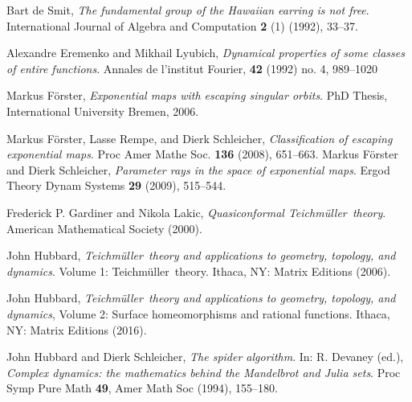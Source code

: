 \documentclass[10pt,reqno,a4paper]{amsart}
\numberwithin{figure}{section}
\numberwithin{equation}{section}
\newcommand{\tei}{Teichm\"uller}
\begin{document}
\begin{thebibliography}{RSSS}
	Bart de Smit,
	\emph{The fundamental group of the Hawaiian earring is not free}. International Journal of Algebra and Computation \textbf{2} (1) (1992), 33--37.
	
%	
%	
	Alexandre Eremenko and Mikhail Lyubich, \emph{Dynamical properties of some classes of
		entire functions}. Annales de l’institut Fourier, \textbf{42} (1992) no. 4, 989--1020
	
	Markus F\"orster, 
	\emph{Exponential maps with escaping singular orbits}. 
	PhD Thesis, International University Bremen, 2006.
	
%	
	Markus F\"orster, Lasse Rempe, and Dierk Schleicher,
	\emph{Classification of escaping exponential maps}. Proc Amer Mathe Soc. \textbf{136} (2008), 651--663.
%	
	Markus F\"orster and Dierk Schleicher,  \emph{Parameter rays in the space of exponential maps}. Ergod Theory Dynam Systems \textbf{29} (2009), 515--544.
	
	Frederick P. Gardiner and Nikola Lakic, \emph{Quasiconformal \tei\ theory}. American Mathematical Society (2000).
	
	John Hubbard, \emph{\tei\ theory and applications to geometry, topology, and dynamics}. Volume 1: \tei\ theory. Ithaca, NY: Matrix Editions (2006).
	
	John Hubbard, \emph{\tei\ theory and applications to geometry, topology, and dynamics}, Volume 2: Surface homeomorphisms and rational functions. 
	Ithaca, NY: Matrix Editions (2016).
	
	John Hubbard and Dierk Schleicher, 
	\emph{The spider algorithm}. 
	In: R. Devaney (ed.), \emph{Complex dynamics: the mathematics behind the Mandelbrot and Julia sets}. Proc Symp Pure Math \textbf{49}, 
	Amer Math Soc (1994), 155--180. 
	

\end{thebibliography}
\end{document}
